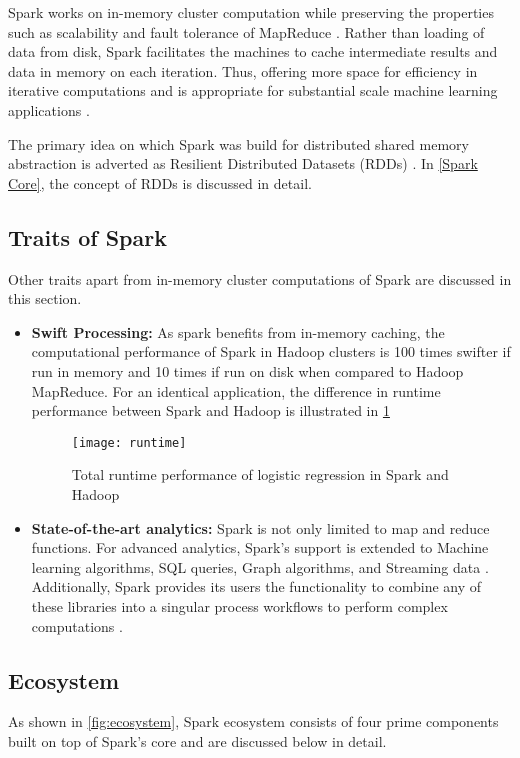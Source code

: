  
\par Spark works on in-memory cluster computation while preserving the properties such as scalability and fault tolerance of MapReduce \cite{zaharia2010spark}. Rather than loading of data from disk, Spark facilitates the machines to cache intermediate results and data in memory on each iteration. Thus, offering more space for efficiency in iterative computations and is appropriate for substantial scale machine learning applications \cite{bao2016large}.

\par  The primary idea on which Spark was build for distributed shared memory abstraction is adverted as Resilient Distributed Datasets (RDDs)  \cite{Zaharia2012}. In \ref{Spark Core}, the concept of RDDs is discussed in detail. 


\subsection{Traits of Spark}
Other traits apart from in-memory cluster computations of Spark are discussed in this section.
\begin{itemize}
\item \textbf{Swift Processing:} As spark benefits from in-memory caching, the computational performance of Spark in Hadoop clusters is 100 times swifter if run in memory and 10 times if run on disk when compared to Hadoop MapReduce\cite{spark:website}. For an identical application, the difference in runtime performance between Spark and Hadoop is illustrated in \ref{fig:runtime}

\begin{figure}[htbp]
	\centering
		\texttt{[image: runtime]}
	\caption{Total runtime performance of logistic regression in Spark and Hadoop \cite{spark:website} }
	\label{fig:runtime}
\end{figure}

\item \textbf{State-of-the-art analytics:} Spark is not only limited to map and reduce functions. For advanced analytics,  Spark's support is extended to Machine learning algorithms, SQL queries, Graph algorithms, and Streaming data \cite{ranjani2016spark}. Additionally, Spark provides its users the functionality to combine any of these libraries into a singular process workflows to perform complex computations \cite{Jonnalagadda2016}.
\end{itemize}

\newpage
\subsection{Ecosystem}
As shown in \vref{fig:ecosystem}, Spark ecosystem consists of four prime components built on top of Spark's core and are discussed below in detail.

